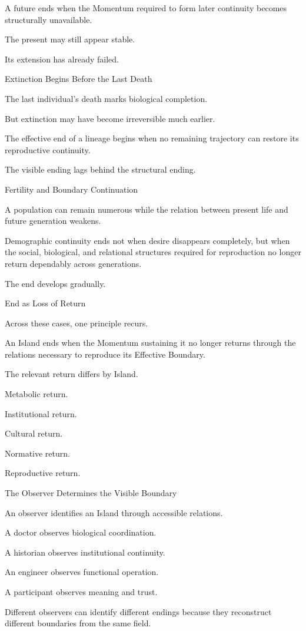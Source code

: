 A future ends when the Momentum required to form later continuity becomes structurally unavailable.

The present may still appear stable.

Its extension has already failed.

Extinction Begins Before the Last Death

The last individual’s death marks biological completion.

But extinction may have become irreversible much earlier.

The effective end of a lineage begins when no remaining trajectory can restore its reproductive continuity.

The visible ending lags behind the structural ending.

Fertility and Boundary Continuation

A population can remain numerous while the relation between present life and future generation weakens.

Demographic continuity ends not when desire disappears completely, but when the social, biological, and relational structures required for reproduction no longer return dependably across generations.

The end develops gradually.

End as Loss of Return

Across these cases, one principle recurs.

An Island ends when the Momentum sustaining it no longer returns through the relations necessary to reproduce its Effective Boundary.

The relevant return differs by Island.

Metabolic return.

Institutional return.

Cultural return.

Normative return.

Reproductive return.

The Observer Determines the Visible Boundary

An observer identifies an Island through accessible relations.

A doctor observes biological coordination.

A historian observes institutional continuity.

An engineer observes functional operation.

A participant observes meaning and trust.

Different observers can identify different endings because they reconstruct different boundaries from the same field.

